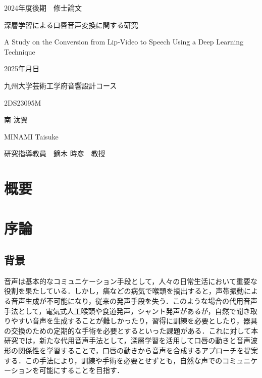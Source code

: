 \documentclass[12pt]{jarticle}
\numberwithin{equation}{section}    %
\numberwithin{figure}{section}      %
\numberwithin{table}{section}      %
\begin{document}
\begin{titlepage}
    \begin{center}
        {\Large 2024年度後期　修士論文}
        \vspace{120truept}

        {\huge 深層学習による口唇音声変換に関する研究}
        \vspace{30truept}

        {\huge A Study on the Conversion from Lip-Video to Speech Using a Deep Learning Technique}
        \vspace{120truept}

        {\Large 2025年月日}
        \vspace{10truept}

        {\Large 九州大学芸術工学府音響設計コース}
        \vspace{70truept}

        {\Large 2DS23095M}
        \vspace{10truept}

        {\Large 南 汰翼}
        \vspace{10truept}

        {\Large MINAMI Taisuke}
        \vspace{30truept}

        {\Large 研究指導教員　鏑木 時彦　教授}
    \end{center}
\end{titlepage}

\section*{概要}
\thispagestyle{empty}
\clearpage

\setcounter{tocdepth}{2}
\tableofcontents
\thispagestyle{empty}
\clearpage

\pagestyle{plain}
\setcounter{page}{1}

\section{序論}
\subsection{背景}
音声は基本的なコミュニケーション手段として，人々の日常生活において重要な役割を果たしている．しかし，癌などの病気で喉頭を摘出すると，声帯振動による音声生成が不可能になり，従来の発声手段を失う．このような場合の代用音声手法として，電気式人工喉頭や食道発声，シャント発声があるが，自然で聞き取りやすい音声を生成することが難しかったり，習得に訓練を必要としたり，器具の交換のための定期的な手術を必要とするといった課題がある．これに対して本研究では，新たな代用音声手法として，深層学習を活用して口唇の動きと音声波形の関係性を学習することで，口唇の動きから音声を合成するアプローチを提案する．この手法により，訓練や手術を必要とせずとも，自然な声でのコミュニケーションを可能にすることを目指す．
\end{document}
